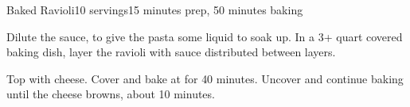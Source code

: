\documentclass[../Cookbook.tex]{subfiles}
\begin{document}
\begin{recipe}[BakedRavioli]{Baked Ravioli}{10 servings}{15 minutes prep, 50 minutes baking}

Dilute the sauce, to give the pasta some liquid to soak up.
In a 3+ quart covered baking dish, layer the ravioli with sauce distributed between layers.

Top with cheese.
Cover and bake at  for 40 minutes.
Uncover and continue baking until the cheese browns, about 10 minutes.

\end{recipe}
\end{document}
